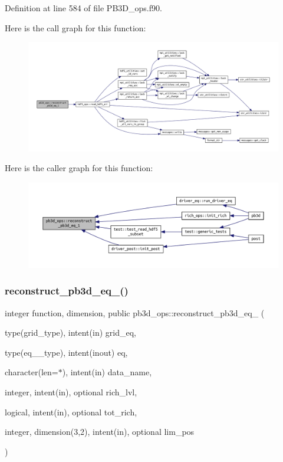 Definition at line 584 of file P\+B3\+D\+\_\+ops.\+f90.

Here is the call graph for this function\+:
\nopagebreak
\begin{figure}[H]
\begin{center}
\leavevmode
\includegraphics[width=350pt]{namespacepb3d__ops_a248d51dc98b7de287499ba3a4e6c1eaa_cgraph}
\end{center}
\end{figure}
Here is the caller graph for this function\+:
\nopagebreak
\begin{figure}[H]
\begin{center}
\leavevmode
\includegraphics[width=350pt]{namespacepb3d__ops_a248d51dc98b7de287499ba3a4e6c1eaa_icgraph}
\end{center}
\end{figure}
\mbox{\label{namespacepb3d__ops_a13280910f320a6835cd19e62fe238240}} 
\subsubsection{\texorpdfstring{reconstruct\+\_\+pb3d\+\_\+eq\+\_()}{reconstruct\_pb3d\_eq\_2()}}
{\footnotesize\ttfamily integer function, dimension, public pb3d\+\_\+ops\+::reconstruct\+\_\+pb3d\+\_\+eq\+\_ (\begin{DoxyParamCaption}\item[{type(grid\+\_\+type), intent(in)}]{grid\+\_\+eq,  }\item[{type(eq\+\_\+2\+\_\+type), intent(inout)}]{eq,  }\item[{character(len=$\ast$), intent(in)}]{data\+\_\+name,  }\item[{integer, intent(in), optional}]{rich\+\_\+lvl,  }\item[{logical, intent(in), optional}]{tot\+\_\+rich,  }\item[{integer, dimension(3,2), intent(in), optional}]{lim\+\_\+pos }\end{DoxyParamCaption})}



